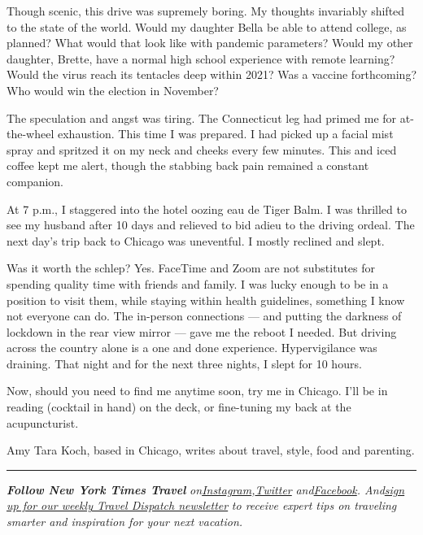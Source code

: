 Though scenic, this drive was supremely boring. My thoughts invariably
shifted to the state of the world. Would my daughter Bella be able to
attend college, as planned? What would that look like with pandemic
parameters? Would my other daughter, Brette, have a normal high school
experience with remote learning? Would the virus reach its tentacles
deep within 2021? Was a vaccine forthcoming? Who would win the election
in November?

The speculation and angst was tiring. The Connecticut leg had primed me
for at-the-wheel exhaustion. This time I was prepared. I had picked up a
facial mist spray and spritzed it on my neck and cheeks every few
minutes. This and iced coffee kept me alert, though the stabbing back
pain remained a constant companion.

At 7 p.m., I staggered into the hotel oozing eau de Tiger Balm. I was
thrilled to see my husband after 10 days and relieved to bid adieu to
the driving ordeal. The next day's trip back to Chicago was uneventful.
I mostly reclined and slept.

Was it worth the schlep? Yes. FaceTime and Zoom are not substitutes for
spending quality time with friends and family. I was lucky enough to be
in a position to visit them, while staying within health guidelines,
something I know not everyone can do. The in-person connections --- and
putting the darkness of lockdown in the rear view mirror --- gave me the
reboot I needed. But driving across the country alone is a one and done
experience. Hypervigilance was draining. That night and for the next
three nights, I slept for 10 hours.

Now, should you need to find me anytime soon, try me in Chicago. I'll be
in reading (cocktail in hand) on the deck, or fine-tuning my back at the
acupuncturist.

Amy Tara Koch, based in Chicago, writes about travel, style, food and
parenting.

\begin{center}\rule{0.5\linewidth}{\linethickness}\end{center}

\emph{\textbf{Follow New York Times Travel}}
\emph{on}\href{https://www.instagram.com/nytimestravel/}{\emph{Instagram}}\emph{,}\href{https://twitter.com/nytimestravel}{\emph{Twitter}}
\emph{and}\href{https://www.facebookcorewwwi.onion/nytimestravel/}{\emph{Facebook}}\emph{.
And}\href{https://www.nytimes3xbfgragh.onion/newsletters/traveldispatch}{\emph{sign
up for our weekly Travel Dispatch newsletter}} \emph{to receive expert
tips on traveling smarter and inspiration for your next vacation.}

